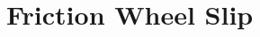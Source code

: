 \documentclass[../main.tex]{subfiles}
\begin{document}
\section{Friction Wheel Slip} \label{frictionSlip}
\end{document}
